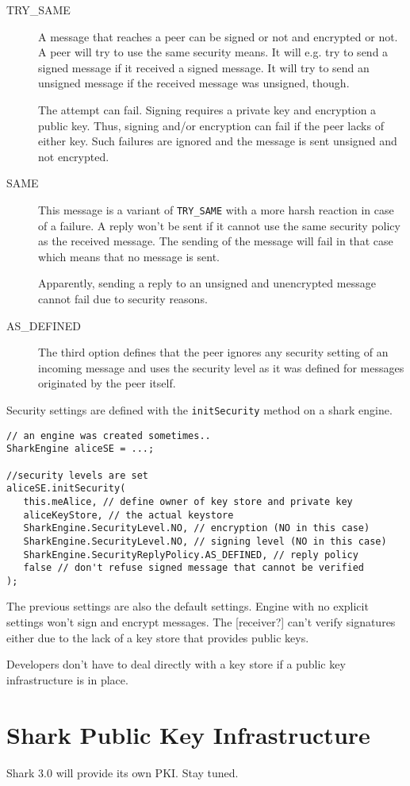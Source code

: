 \begin{description}
    \item[TRY\_SAME] A message that reaches a peer can be signed or not and encrypted or not. A peer will try to use the same security means. It will e.g. try to send a signed message if it received a signed message. It will try to send an unsigned message if the received message was unsigned, though.

The attempt can fail. Signing requires a private key and encryption a public key. Thus, signing and/or encryption can fail if the peer lacks of either key. Such failures are ignored and the message is sent unsigned and not encrypted.

    \item[SAME] This message is a variant of {\tt TRY\_SAME} with a more harsh reaction in case of a failure. A reply won't be sent if it cannot use the same security policy as the received message. The sending of the message will fail in that case which means that no message is sent.

Apparently, sending a reply to an unsigned and unencrypted message cannot fail due to security reasons.

    \item[AS\_DEFINED] The third option defines that the peer ignores any security setting of an incoming message and uses the security level as it was defined for messages originated by the peer itself.

\end{description}

Security settings are defined with the {\tt initSecurity} method on a shark engine.

\begin{verbatim}
// an engine was created sometimes..
SharkEngine aliceSE = ...;

//security levels are set
aliceSE.initSecurity(
   this.meAlice, // define owner of key store and private key
   aliceKeyStore, // the actual keystore
   SharkEngine.SecurityLevel.NO, // encryption (NO in this case)
   SharkEngine.SecurityLevel.NO, // signing level (NO in this case) 
   SharkEngine.SecurityReplyPolicy.AS_DEFINED, // reply policy
   false // don't refuse signed message that cannot be verified
);
\end{verbatim}

The previous settings are also the default settings. Engine with no
explicit settings won't sign and encrypt messages. The [receiver?] can't verify signatures either due to the lack of a key store that provides public keys.

Developers don't have to deal directly with a key store if a public key infrastructure is in place.

\section{Shark Public Key Infrastructure}
Shark 3.0 will provide its own PKI. Stay tuned.


